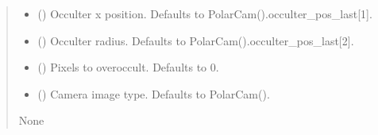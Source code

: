\documentclass[letterpaper,10pt,english]{sphinxmanual}
\begin{document}
\begin{fulllineitems}
\begin{fulllineitems}
\begin{quote}
\begin{description}
\begin{itemize}
\item {} 
\sphinxAtStartPar
{} (\sphinxstyleliteralemphasis{\sphinxupquote{, }}) \textendash{} Occulter x position. Defaults to PolarCam().occulter\_pos\_last{[}1{]}.

\item {} 
\sphinxAtStartPar
{} (\sphinxstyleliteralemphasis{\sphinxupquote{, }}) \textendash{} Occulter radius. Defaults to PolarCam().occulter\_pos\_last{[}2{]}.

\item {} 
\sphinxAtStartPar
{} (\sphinxstyleliteralemphasis{\sphinxupquote{, }}) \textendash{} Pixels to overoccult. Defaults to 0.

\item {} 
\sphinxAtStartPar
{} (\sphinxstyleliteralemphasis{\sphinxupquote{, }}) \textendash{} Camera image type. Defaults to PolarCam().

\end{itemize}

\sphinxAtStartPar
None

\end{description}\end{quote}

\end{fulllineitems}


\begin{fulllineitems}
\label{\detokenize{micropolarray:micropolarray.micropol_image.MicropolImage.pB}}
\pysigstartsignatures
{}
\pysigstopsignatures
\end{fulllineitems}


\end{fulllineitems}
\end{document}
